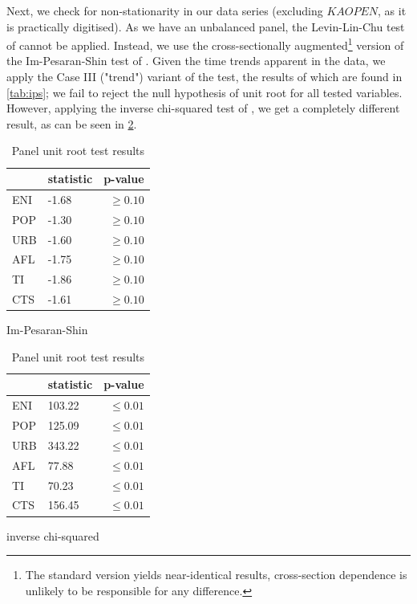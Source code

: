 \documentclass[12pt,a4paper]{article}
\begin{document}
Next, we check for non-stationarity in our data series (excluding $KAOPEN$, as it is practically digitised). 
As we have an unbalanced panel, the Levin-Lin-Chu test of \cite{levinUnitRootTests2002} cannot be applied.
Instead, we use the cross-sectionally augmented\footnote{The standard version yields near-identical results, cross-section dependence is unlikely to be responsible for any difference.} version of the Im-Pesaran-Shin test of \cite{pesaranSimplePanelUnit2007}.
Given the time trends apparent in the data, we apply the Case III ("trend") variant of the test, the results of which are found in \cref{tab:ips}; we fail to reject the null hypothesis of unit root for all tested variables.
However, applying the inverse chi-squared test of \cite{maddalaComparativeStudyUnit1999}, we get a completely different result, as can be seen in \cref{tab:madwu}.

\begin{table}[htbp]
\centering
\begin{subtable}{0.45\textwidth}
\centering
\begin{tabular}{llr}
\toprule
{} & statistic &      p-value \\
\midrule
ENI &     -1.68 &  $\geq 0.10$ \\
POP &     -1.30 &  $\geq 0.10$ \\
URB &     -1.60 &  $\geq 0.10$ \\
AFL &     -1.75 &  $\geq 0.10$ \\
TI  &     -1.86 &  $\geq 0.10$ \\
CTS &     -1.61 &  $\geq 0.10$ \\
\bottomrule
\end{tabular}


\caption{Im-Pesaran-Shin}
\label{tab:ips}
\end{subtable}
\begin{subtable}{0.45\textwidth}
\centering
\begin{tabular}{llr}
\toprule
{} & statistic &      p-value \\
\midrule
ENI &    103.22 &  $\leq 0.01$ \\
POP &    125.09 &  $\leq 0.01$ \\
URB &    343.22 &  $\leq 0.01$ \\
AFL &     77.88 &  $\leq 0.01$ \\
TI  &     70.23 &  $\leq 0.01$ \\
CTS &    156.45 &  $\leq 0.01$ \\
\bottomrule
\end{tabular}
\caption{inverse chi-squared}
\label{tab:madwu}
\end{subtable}
\caption{Panel unit root test results}
\end{table}
\end{document}
